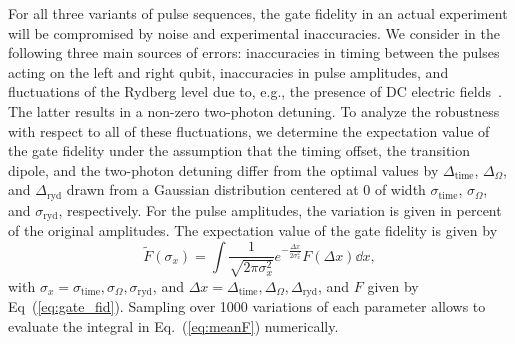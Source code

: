 For all three variants of pulse sequences, the gate fidelity in an
actual experiment will be compromised by noise and experimental
inaccuracies. We consider in the following three main sources of
errors: inaccuracies in timing between the pulses acting on the left and right
qubit, inaccuracies in pulse
amplitudes, and fluctuations of the Rydberg level due to, e.g., the
presence of DC electric fields~\cite{MuellerKochSpIssue11}. The latter
results in a non-zero two-photon detuning.
To analyze the robustness with respect to all of these fluctuations, we
determine the expectation value of the gate fidelity under the assumption that
the timing offset, the transition dipole, and the two-photon detuning
differ from the optimal values by $\Delta_{\text{time}}$,
$\Delta_{\Omega}$, and $\Delta_{\text{ryd}}$ drawn from a Gaussian
distribution centered at 0 of width $\sigma_{\text{time}}$, $\sigma_{\Omega}$, and
$\sigma_{\text{ryd}}$, respectively. For the pulse amplitudes,
the variation is given in percent of the original amplitudes. The expectation
value of the gate fidelity is given by
\begin{equation}
  \label{eq:meanF}
  \tilde F(\sigma_x)
  = \int  \frac{1}{\sqrt{2 \pi \sigma_x^2}}
          e^{-\frac{\Delta x}{2 \sigma_x^2}}
          F(\Delta x) \dd x,
\end{equation}
with $\sigma_{x} = \sigma_{\text{time}}, \sigma_{\Omega}, \sigma_{\text{ryd}}$,
and $\Delta x = \Delta_{\text{time}}, \Delta_{\Omega}, \Delta_{\text{ryd}}$, and
$F$ given by Eq~(\ref{eq:gate_fid}).
Sampling over 1000 variations of each parameter allows to evaluate the
integral in Eq.~(\ref{eq:meanF}) numerically.

